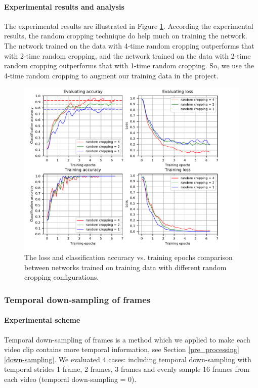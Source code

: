 \paragraph{Experimental results and analysis}
The experimental results are illustrated in Figure \ref{fig:plot_rc}. According the experimental results, the random cropping technique do help much on training the network. The network trained on the data with 4-time random cropping outperforms that with 2-time random cropping, and the network trained on the data with 2-time random cropping outperforms that with 1-time random cropping. So, we use the 4-time random cropping to augment our training data in the project.
\begin{figure}
	\includegraphics[trim=0cm 0cm 0cm 0cm]{fig01/plot_rc.pdf}
	\caption{The loss and classification accuracy vs. training epochs comparison between networks trained on training data with different random cropping configurations.}
	\label{fig:plot_rc}
\end{figure}


\subsubsection{Temporal down-sampling of frames}
\paragraph{Experimental scheme}
Temporal down-sampling of frames is a method which we applied to make each video clip contains more temporal information, see Section \ref{pre_processing} \ref{down-sampling}. We evaluated 4 cases: including temporal down-sampling with temporal strides 1 frame, 2 frames, 3 frames and evenly sample 16 frames from each video (temporal down-sampling = 0).  

